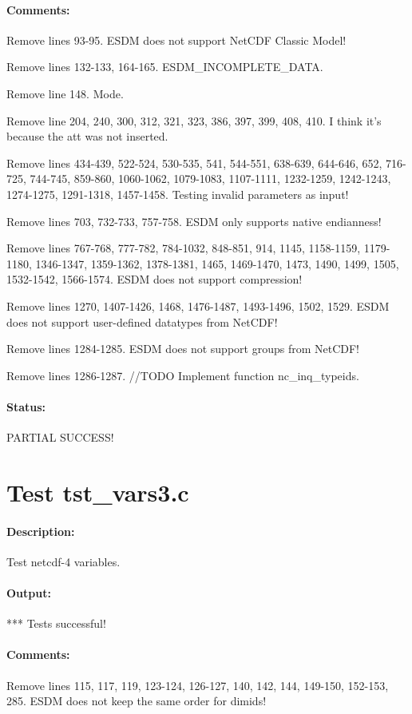 \paragraph{Comments:} Remove lines 93-95. ESDM does not support NetCDF Classic Model!

Remove lines 132-133, 164-165. ESDM\_INCOMPLETE\_DATA.

Remove line 148. Mode.

Remove line 204, 240, 300, 312, 321, 323, 386, 397, 399, 408, 410. I think it's because the att was not inserted.

Remove lines 434-439, 522-524, 530-535, 541, 544-551, 638-639, 644-646, 652, 716-725, 744-745, 859-860, 1060-1062, 1079-1083, 1107-1111, 1232-1259, 1242-1243, 1274-1275, 1291-1318, 1457-1458. Testing invalid parameters as input!

Remove lines 703, 732-733, 757-758. ESDM only supports native endianness!

Remove lines 767-768, 777-782, 784-1032, 848-851, 914, 1145, 1158-1159, 1179-1180, 1346-1347, 1359-1362, 1378-1381, 1465, 1469-1470, 1473, 1490, 1499, 1505, 1532-1542, 1566-1574. ESDM does not support compression!

Remove lines 1270, 1407-1426, 1468, 1476-1487, 1493-1496, 1502, 1529. ESDM does not support user-defined datatypes from NetCDF!

Remove lines 1284-1285. ESDM does not support groups from NetCDF!

Remove lines 1286-1287. //TODO Implement function nc\_inq\_typeids.

\paragraph{Status:} PARTIAL SUCCESS!

\section{Test tst\_vars3.c}

\paragraph{Description:} Test netcdf-4 variables.

\paragraph{Output:} *** Tests successful!

\paragraph{Comments:} Remove lines 115, 117, 119, 123-124, 126-127, 140, 142, 144, 149-150, 152-153, 285. ESDM does not keep the same order for dimids!

